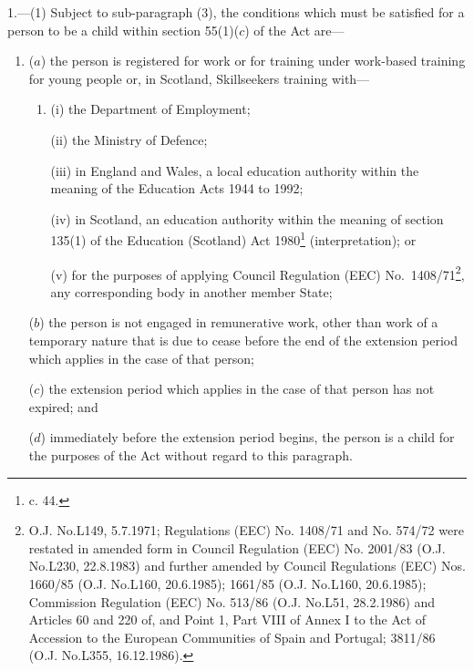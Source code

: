 \documentclass[a4paper,12pt]{article}
\begin{document}
1.—(1) Subject to sub-paragraph (3), the conditions which must be satisfied for a person to be a child within section 55(1)($c$) of the Act are—
\begin{enumerate}\item[]
($a$) the person is registered for work or for training under 
work-based training for young people or, in Scotland, Skillseekers training  %
with—
\begin{enumerate}\item[]
(i) the Department of Employment;

(ii) the Ministry of Defence;

(iii) in England and Wales, a local education authority within the meaning of the Education Acts 1944 to 1992;

(iv) in Scotland, an education authority within the meaning of section 135(1) of the Education (Scotland) Act 1980\footnote{ c. 44.} (interpretation); or

(v) for the purposes of applying Council Regulation (EEC)
No.\ 1408/\hspace{0pt}71\footnote{\frenchspacing O.J. No.L149, 5.7.1971; Regulations (EEC) No. 1408/71 and No. 574/72 were restated in amended form in Council Regulation (EEC) No. 2001/83 (O.J. No.L230, 22.8.1983) and further amended by Council Regulations (EEC) Nos. 1660/85 (O.J. No.L160, 20.6.1985); 1661/85 (O.J. No.L160, 20.6.1985); Commission Regulation (EEC) No. 513/86 (O.J. No.L51, 28.2.1986) and Articles 60 and 220 of, and Point 1, Part VIII of Annex I to the Act of Accession to the European Communities of Spain and Portugal; 3811/86 (O.J. No.L355, 16.12.1986).}, any corresponding body in another member State;
\end{enumerate}

($b$) the person is not engaged in remunerative work, other than work of a temporary nature that is due to cease before the end of the extension period which applies in the case of that person;

($c$) the extension period which applies in the case of that person has not expired; and

($d$) immediately before the extension period begins, the person is a child for the purposes of the Act without regard to this paragraph.
\end{enumerate}
\end{document}
